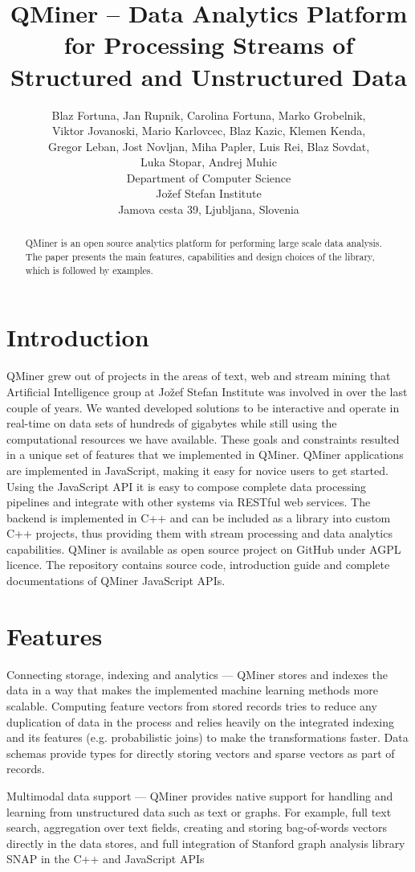 \documentclass{article} %
\title{QMiner – Data Analytics Platform for Processing Streams of Structured and Unstructured Data}
\author{
Blaz Fortuna, Jan Rupnik, Carolina Fortuna, Marko Grobelnik, \\
Viktor Jovanoski, Mario Karlovcec, Blaz Kazic, Klemen Kenda, \\
Gregor Leban, Jost Novljan, Miha Papler, Luis Rei, Blaz Sovdat, \\
Luka Stopar, Andrej Muhic \\
Department of Computer Science\\
Jožef Stefan Institute\\
Jamova cesta 39, Ljubljana, Slovenia \\
}
\begin{document}
\maketitle

\begin{abstract}
   QMiner is an open source analytics platform for performing large scale data analysis. The paper presents the main features, capabilities and design choices of the library, which is followed by examples.
\end{abstract}

\section{Introduction}
   QMiner grew out of projects in the areas of text, web and stream mining that Artificial Intelligence group at Jo\v{z}ef Stefan Institute was involved in over the last couple of years. We wanted developed solutions to be interactive and operate in real-time on data sets of hundreds of gigabytes while still using the computational resources we have available. These goals and constraints resulted in a unique set of features that we implemented in QMiner.
   QMiner applications are implemented in JavaScript, making it easy for novice users to get started. Using the JavaScript API it is easy to compose complete data processing pipelines and integrate with other systems via RESTful web services. The backend is implemented in C++ and can be included as a library into custom C++ projects, thus providing them with stream processing and data analytics capabilities.
   QMiner is available as open source project on GitHub under AGPL licence. The repository contains source code, introduction guide and complete documentations of QMiner JavaScript APIs.

\section{Features}
   Connecting storage, indexing and analytics --- QMiner stores and indexes the data in a way that makes the implemented machine learning methods more scalable. Computing feature vectors from stored records tries to reduce any duplication of data in the process and relies heavily on the integrated indexing and its features (e.g. probabilistic joins) to make the transformations faster. Data schemas provide types for directly storing vectors and sparse vectors as part of records.
   
   Multimodal data support --- QMiner provides native support for handling and learning from unstructured data such as text or graphs. For example, full text search, aggregation over text fields, creating and storing bag-of-words vectors directly in the data stores, and full integration of Stanford graph analysis library SNAP in the C++ and JavaScript APIs
   
\end{document}
